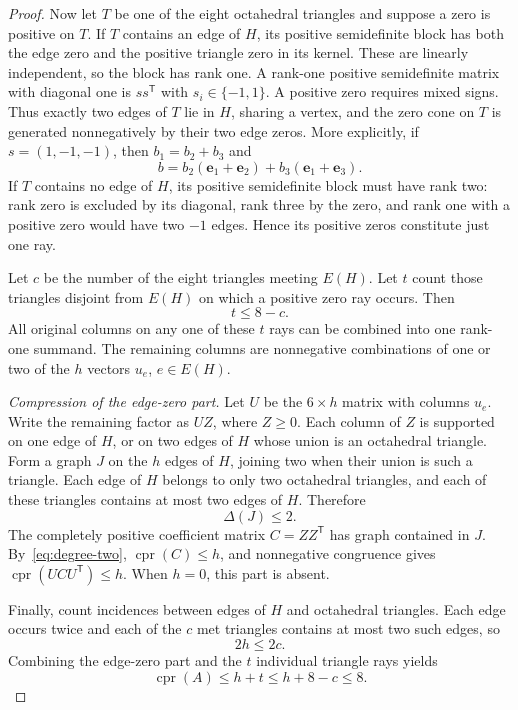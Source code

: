 \documentclass[11pt,a4paper]{article}
\theoremstyle{definition}
\DeclareMathOperator{\cpr}{cpr}
\newcommand{\ee}{\mathbf e}
\newcommand{\T}{\mathsf T}
\begin{document}
\begin{proof}
Now let $T$ be one of the eight octahedral triangles and suppose a zero is positive on $T$. If $T$ contains an edge of $H$, its positive semidefinite block has both the edge zero and the positive triangle zero in its kernel. These are linearly independent, so the block has rank one. A rank-one positive semidefinite matrix with diagonal one is $ss^{\T}$ with $s_i\in\{-1,1\}$. A positive zero requires mixed signs. Thus exactly two edges of $T$ lie in $H$, sharing a vertex, and the zero cone on $T$ is generated nonnegatively by their two edge zeros. More explicitly, if $s=(1,-1,-1)$, then $b_1=b_2+b_3$ and
\[
 b=b_2(\ee_1+\ee_2)+b_3(\ee_1+\ee_3).
\]
If $T$ contains no edge of $H$, its positive semidefinite block must have rank two: rank zero is excluded by its diagonal, rank three by the zero, and rank one with a positive zero would have two $-1$ edges. Hence its positive zeros constitute just one ray.

Let $c$ be the number of the eight triangles meeting $E(H)$. Let $t$ count those triangles disjoint from $E(H)$ on which a positive zero ray occurs. Then
\begin{equation}\label{eq:tcount}
 t\leq8-c.
\end{equation}
All original columns on any one of these $t$ rays can be combined into one rank-one summand. The remaining columns are nonnegative combinations of one or two of the $h$ vectors $u_e$, $e\in E(H)$.

\medskip\noindent\emph{Compression of the edge-zero part.}
Let $U$ be the $6\times h$ matrix with columns $u_e$. Write the remaining factor as $UZ$, where $Z\geq0$. Each column of $Z$ is supported on one edge of $H$, or on two edges of $H$ whose union is an octahedral triangle. Form a graph $J$ on the $h$ edges of $H$, joining two when their union is such a triangle. Each edge of $H$ belongs to only two octahedral triangles, and each of these triangles contains at most two edges of $H$. Therefore
\[
 \Delta(J)\leq2.
\]
The completely positive coefficient matrix $C=ZZ^{\T}$ has graph contained in $J$. By~\eqref{eq:degree-two}, $\cpr(C)\leq h$, and nonnegative congruence gives $\cpr(UCU^{\T})\leq h$. When $h=0$, this part is absent.

Finally, count incidences between edges of $H$ and octahedral triangles. Each edge occurs twice and each of the $c$ met triangles contains at most two such edges, so
\begin{equation}\label{eq:hcount}
 2h\leq2c.
\end{equation}
Combining the edge-zero part and the $t$ individual triangle rays yields
\[
 \cpr(A)\leq h+t\leq h+8-c\leq8.
\]
\end{proof}
\end{document}
